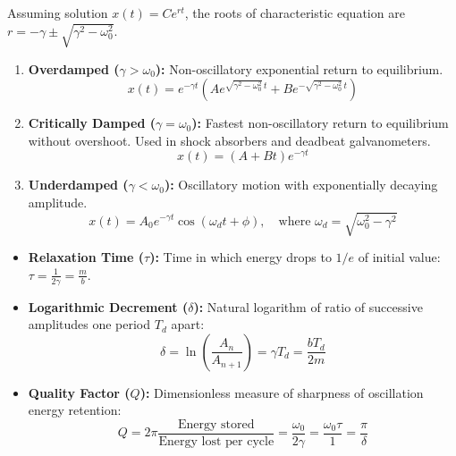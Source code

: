 \documentclass[12pt,a4paper]{article}
\begin{document}
Assuming solution $x(t) = C e^{r t}$, the roots of characteristic equation are $r = -\gamma \pm \sqrt{\gamma^2 - \omega_0^2}$.

\begin{tcolorbox}[formulabox, title={\textbf{Three Cases of Damped Motion}}]
\begin{enumerate}[leftmargin=*, itemsep=4pt]
  \item \textbf{Overdamped ($\gamma > \omega_0$):} Non-oscillatory exponential return to equilibrium.
  \begin{equation}
  x(t) = e^{-\gamma t} \left( A e^{\sqrt{\gamma^2 - \omega_0^2}\,t} + B e^{-\sqrt{\gamma^2 - \omega_0^2}\,t} \right)
  \end{equation}
  \item \textbf{Critically Damped ($\gamma = \omega_0$):} Fastest non-oscillatory return to equilibrium without overshoot. Used in shock absorbers and deadbeat galvanometers.
  \begin{equation}
  x(t) = (A + B t) e^{-\gamma t}
  \end{equation}
  \item \textbf{Underdamped ($\gamma < \omega_0$):} Oscillatory motion with exponentially decaying amplitude.
  \begin{equation}
  x(t) = A_0 e^{-\gamma t} \cos(\omega_d t + \phi), \quad \text{where } \omega_d = \sqrt{\omega_0^2 - \gamma^2}
  \end{equation}
\end{enumerate}
\end{tcolorbox}

\begin{tcolorbox}[defbox, title={\textbf{Damping Parameters: Logarithmic Decrement and Quality Factor}}]
\begin{itemize}[leftmargin=*, itemsep=3pt]
  \item \textbf{Relaxation Time ($\tau$):} Time in which energy drops to $1/e$ of initial value: $\tau = \frac{1}{2\gamma} = \frac{m}{b}$.
  \item \textbf{Logarithmic Decrement ($\delta$):} Natural logarithm of ratio of successive amplitudes one period $T_d$ apart:
  \begin{equation}
  \delta = \ln\left(\frac{A_n}{A_{n+1}}\right) = \gamma T_d = \frac{b T_d}{2m}
  \end{equation}
  \item \textbf{Quality Factor ($Q$):} Dimensionless measure of sharpness of oscillation energy retention:
  \begin{equation}
  Q = 2\pi \frac{\text{Energy stored}}{\text{Energy lost per cycle}} = \frac{\omega_0}{2\gamma} = \frac{\omega_0 \tau}{1} = \frac{\pi}{\delta}
  \end{equation}
\end{itemize}
\end{tcolorbox}
\end{document}
